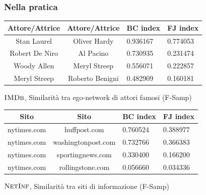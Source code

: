 \begin{frame}
	\frametitle{Nella pratica}
	
	\pause
	
	\centering
	\begin{table}[h]
		\centering
		\begin{tabular}{c|c|l|l}
			Attore/Attrice & Attore/Attrice  & BC index & FJ index \\ 
			\hline
			Stan Laurel    & Oliver Hardy    & 0.936167 & 0.774053 \\
			Robert De Niro & Al Pacino       & 0.730935 & 0.231474 \\
			Woody Allen    & Meryl Streep    & 0.556071 & 0.222857 \\
			Meryl Streep   & Roberto Benigni & 0.482909 & 0.160181 \\
		\end{tabular}
		\medskip
		
		$\textsc{IMDb}$, Similarità tra ego-network di attori famosi (F-Samp)
	\end{table}

	\pause

	\begin{table}[h]
		\centering
		\begin{tabular}{c|c|l|l}
			Sito           & Sito            & BC index & FJ index \\ 
			\hline
			nytimes.com  & huffpost.com       & 0.760524 & 0.388977 \\
			nytimes.com  & washingtonpost.com & 0.732766 & 0.366383 \\
			nytimes.com  & sportingnews.com   & 0.330400 & 0.166200\\
			nytimes.com  & rollingstone.com   & 0.056660 & 0.034336 \\
		\end{tabular}
		\medskip
		
		$\textsc{NetInf}$, Similarità tra siti di informazione (F-Samp)
	\end{table}

\end{frame}

